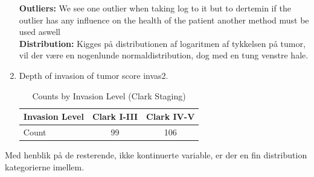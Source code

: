 \begin{enumerate}
\begin{figure}[h]
\begin{subfigure}[b]{0.49\textwidth}
    \end{subfigure}
\end{figure}
\textbf{Outliers: }We see one outlier when taking log to it but to dertemin if the outlier has any influence on the health of the patient another method must be used aswell\\
\textbf{Distribution: }Kigges på distributionen af logaritmen af tykkelsen på tumor, vil der være en nogenlunde normaldistribution, dog med en tung venstre hale.
\item Depth of invasion of tumor score invas2.
\begin{table}[h!]
    \centering
    \begin{tabular}{|l|c|c|}
        \hline
        Invasion Level & Clark I-III & Clark IV-V \\
        \hline
        Count & 99 & 106 \\
        \hline
    \end{tabular}
    \caption{Counts by Invasion Level (Clark Staging)}
    \label{tab:invasion_level}
\end{table}

\end{enumerate}

Med henblik på de resterende, ikke kontinuerte variable, er der en fin distribution kategorierne imellem.



